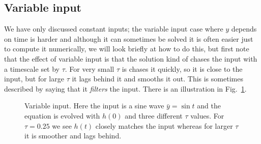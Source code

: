 \documentclass{article}
\begin{document}
\subsection*{Variable input}

We have only discussed constant inputs; the variable input case where
$y$ depends on time is harder and although it can sometimes be solved
it is often easier just to compute it numerically, we will look
briefly at how to do this, but first note that the effect of variable
input is that the solution kind of chases the input with a timescale
set by $\tau$. For very small $\tau$ is chases it quickly, so it is
close to the input, but for large $\tau$ it lags behind it and smooths
it out. This is sometimes described by saying that it \textsl{filters}
the input. There is an illustration in Fig.~\ref{chasing}.

\begin{figure}
\begin{center}

\end{center}
\caption{Variable input. Here the input is a sine wave
  $\bar{y}=\sin{t}$ and the equation is evolved with $h(0)$ and three
  different $\tau$ values. For $\tau=0.25$ we see $h(t)$ closely
  matches the input whereas for larger $\tau$ it is smoother and lags
  behind.\label{chasing}}
\end{figure}
\end{document}
